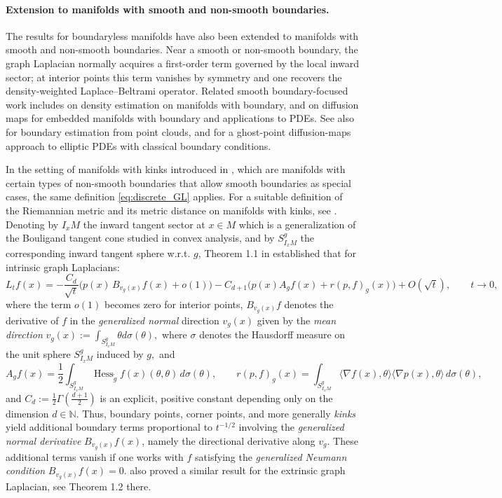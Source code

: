 \documentclass{amsart}
\let\oldcitet\citet
\renewcommand{\citet}[1]{\textcolor{blue}{\oldcitet{#1}}}
\theoremstyle{definition}
\theoremstyle{remark}
\newcommand{\nd}{\noindent}
\newcommand{\bbn}{\mathbb{N}}
\newcommand{\0}{\boldsymbol{0}}
\begin{document}
\paragraph{\textbf{Extension to manifolds with smooth and non-smooth boundaries.}}

\nd The results for boundaryless manifolds have also been extended to manifolds with smooth and non-smooth boundaries. Near a smooth or non-smooth boundary, the graph Laplacian normally acquires a first-order term governed by the local inward sector; at interior points this term vanishes by symmetry and one recovers the density-weighted Laplace–Beltrami operator. Related smooth boundary-focused work includes \citet{BerrySauer2017BoundaryDensity} on density estimation on manifolds with boundary, and \citet{VaughnBerryAntil2024DiffusionBoundary} on diffusion maps for embedded manifolds with boundary and applications to PDEs. See also \citet{CalderParkSlepcev2022BoundaryEstimation} for boundary estimation from point clouds, and \citet{JiangHarlim2023GhostPointDM} for a ghost-point diffusion-maps approach to elliptic PDEs with classical boundary conditions. 



In the setting of manifolds with kinks introduced in \citet{PalTewodrose2025}, which are manifolds with certain types of non-smooth boundaries that allow smooth boundaries as special cases, the same definition \eqref{eq:discrete_GL} applies. For a suitable definition of the Riemannian metric and its metric distance on manifolds with kinks, see \citet{PalTewodrose2025}.  
Denoting by $I_xM$ the inward tangent sector at $x\in M$ which is a generalization of the Bouligand tangent cone studied in convex analysis, and by $S^g_{I_xM}$ the corresponding inward tangent sphere w.r.t. $g$, Theorem 1.1 in \citet{PalTewodrose2025}  established that for intrinsic graph Laplacians:
\[
L_t f(x)
= -\frac{C_d}{\sqrt{t}}
   \big(p(x)\,B_{v_g(x)}f(x)+o(1)\big)
   -C_{d+1}\big(p(x)A_g f(x) + r(p,f)_g(x)\big)
   + O(\sqrt{t}),
   \qquad t\to0,
\]
where the term $o(1)$ becomes zero for interior points, $B_{v_g(x)}f$ denotes the derivative of $f$ in the \textit{generalized normal} direction $v_g(x)$ given by the \textit{mean direction} $v_g(x):=\int_{S^g_{I_xM}} \theta d\sigma(\theta),$ where $\sigma$ denotes the Hausdorff measure on the unit sphere $S^g_{I_xM}$ induced by $g,$ and 
\[
A_g f(x) = \frac{1}{2}\int_{S^g_{I_xM}}
   \operatorname{Hess}_{\tilde{g}}  f(x)(\theta,\theta)\,d\sigma(\theta),
   \qquad
r(p,f)_g(x) = \int_{S^g_{I_xM}}
   \langle\nabla f(x),\theta\rangle
   \langle\nabla p(x),\theta\rangle\,d\sigma(\theta),
\]
and $C_d:=\frac{1}{2}\Gamma(\frac{d+1}{2})$ is an explicit, positive constant depending only on the dimension $d \in \bbn$.  
Thus, boundary points, corner points, and more generally \textit{kinks} yield additional boundary terms proportional to $t^{-1/2}$ involving the \textit{generalized normal derivative} $B_{v_g(x)}f(x)$, namely the directional derivative along $v_g$. These additional terms vanish if one works with $f$ satisfying the \textit{generalized Neumann condition} $B_{v_g(x)}f(x)=0$. \citet{PalTewodrose2025} also proved a similar result for the extrinsic graph Laplacian, see Theorem 1.2 there.
\end{document}
